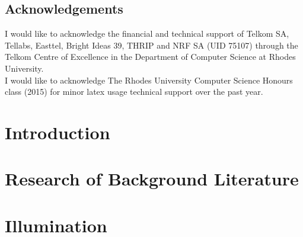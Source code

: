 \documentclass{newrucsthesis}
\begin{document}
	\section*{Acknowledgements}
	I would like to acknowledge the financial and technical support of 
	Telkom SA, Tellabs, Easttel, Bright Ideas 39, THRIP and 
	NRF SA (UID 75107) through the Telkom Centre of Excellence in the
	Department of Computer Science at Rhodes University. \\
	
	I would like to acknowledge The Rhodes University Computer Science 
	Honours class (2015) for minor latex usage technical support over 
	the past year.
	\newpage	
	
	\tableofcontents
	\newpage	
	\listoffigures
	
	\newpage

	\newpage
	
	
	\chapter{Introduction}
	
	
	\chapter{Research of Background Literature}
	
	
	\chapter{Illumination}
	
	
\end{document}
